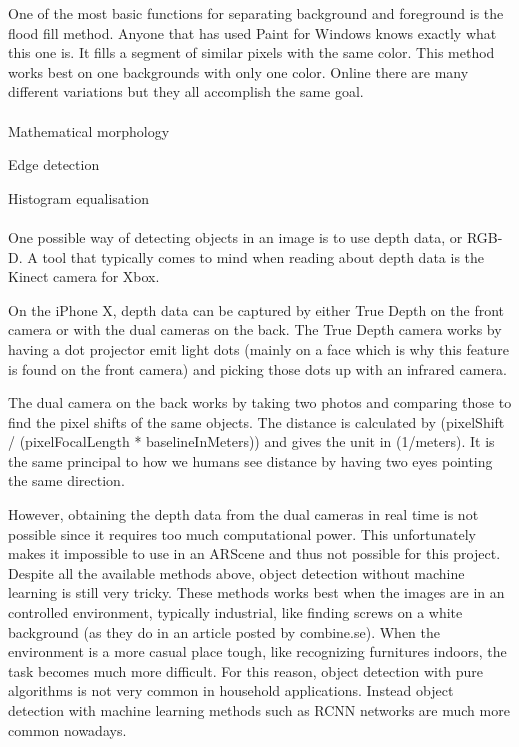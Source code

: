 One of the most basic functions for separating background and foreground is the flood fill method.
Anyone that has used Paint for Windows knows exactly what this one is. It fills a segment of similar pixels with the same color. This method works best on one backgrounds with only one color.
Online there are many different variations but they all accomplish the same goal.\cite{floodFill}
\\\\
Mathematical morphology

Edge detection

Histogram equalisation
\\\\
One possible way of detecting objects in an image is to use depth data, or RGB-D.
A tool that typically comes to mind when reading about depth data is the Kinect camera
for Xbox.

On the iPhone X, depth data can be captured by either True Depth on the front camera or with the dual cameras on the back. The True Depth camera works by having a dot projector emit light dots (mainly on a face which is why this feature is found on the front camera) and picking those dots up with an infrared camera.

The dual camera on the back works by taking two photos and comparing those to find the pixel shifts of the same objects. The distance is calculated by (pixelShift / (pixelFocalLength * baselineInMeters)) and gives the unit in (1/meters). It is the same principal to how we humans see distance by having two eyes pointing the same direction. \cite{depthMap}

However, obtaining the depth data from the dual cameras in real time is not possible since it requires too much computational power. This unfortunately makes it impossible to use in an ARScene and thus not possible for this project.\\

Despite all the available methods above, object detection without machine learning is still very tricky. These methods works best when the images are in an controlled environment, typically industrial, like finding screws on a white background (as they do in an article posted by combine.se). \cite{combine}
When the environment is a more casual place tough, like recognizing furnitures indoors, the task becomes much more difficult. For this reason, object detection with pure algorithms is not very common in household applications. Instead object detection with machine learning methods such as RCNN networks are much more common nowadays.

